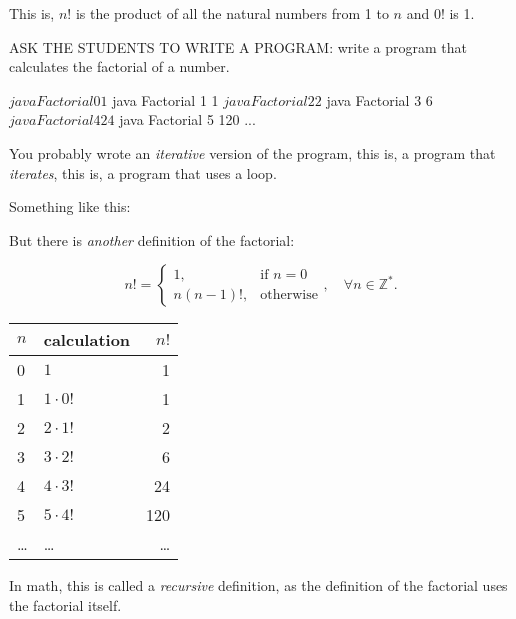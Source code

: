 \documentclass[a4paper, 9pt]{extarticle}
\begin{document}
This is, $n!$ is the product of all the natural numbers from 1 to $n$ and $0!$ is 1.


ASK THE STUDENTS TO WRITE A PROGRAM: write a program that calculates the factorial of a number.

\begin{blackboard}
$ java Factorial 0
1
$ java Factorial 1
1
$ java Factorial 2
2
$ java Factorial 3
6
$ java Factorial 4
24
$ java Factorial 5
120
...
\end{blackboard}


You probably wrote an \emph{iterative} version of the program, this is, a program that \emph{iterates}, this is, a program that uses a loop.

Something like this:



But there is \emph{another} definition of the factorial:
\begin{multicols}{2}
\begin{equation*}
  n! =
  \begin{cases}
    1,              & \text{if } n = 0\\
    n(n-1)!,    & \text{otherwise}
  \end{cases}, \quad \forall n \in \mathbb{Z}^{*}.
\end{equation*}

\columnbreak

\begin{center}
  \begin{tabular}{|l|l|r|}
    \hline
    $n$ & calculation & $n!$\\
    \hline
    0   & $1$          & 1 \\
    1   & $1 \cdot 0!$ & 1 \\
    2   & $2 \cdot 1!$ & 2 \\
    3   & $3 \cdot 2!$ & 6 \\
    4   & $4 \cdot 3!$ & 24 \\
    5   & $5 \cdot 4!$ & 120 \\
    \ldots & \ldots & \ldots \\
    \hline
  \end{tabular}
\end{center}
\end{multicols}

In math, this is called a \emph{recursive} definition, as the definition of the factorial uses the factorial itself.
\end{document}
